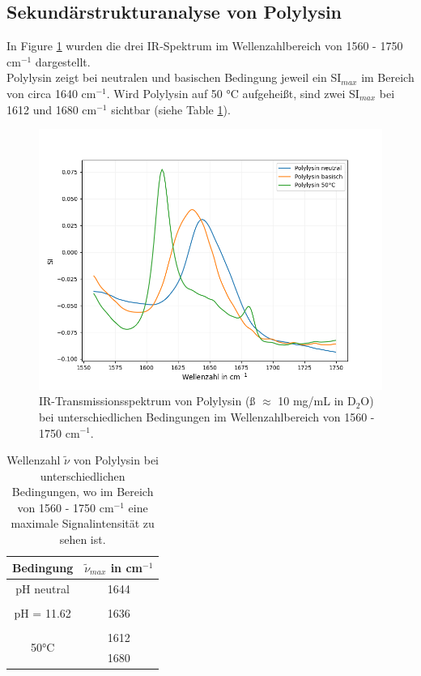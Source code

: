 \documentclass[10pt,a4paper]{article}
\begin{document}
		\subsection{Sekundärstrukturanalyse von Polylysin}
		
			In Figure \ref{fig:polylysin_IR_Spektrum} wurden die drei IR-Spektrum im Wellenzahlbereich von 1560 - 1750 cm$^{-1}$ dargestellt.\\
			Polylysin zeigt bei neutralen und basischen Bedingung jeweil ein SI$_{max}$ im Bereich von circa 1640 cm$^{-1}$. Wird Polylysin auf 50 °C aufgeheißt, sind zwei SI$_{max}$ bei 1612 und 1680 cm$^{-1}$ sichtbar (siehe Table \ref{tab:Polylysin_SI}).
				
			\begin{figure}[H]
				\centering
				\includegraphics[scale=0.65]{Polylysin.png}
				\caption{IR-Transmissionsspektrum von Polylysin (ß $\approx$ 10 mg/mL in D$_2$O) bei unterschiedlichen Bedingungen im Wellenzahlbereich von 1560 - 1750 cm$^{-1}$.}
				\label{fig:polylysin_IR_Spektrum}
			\end{figure}
			
			\begin{table}[H]
				\centering
				\caption{Wellenzahl $\tilde{\nu}$ von Polylysin bei unterschiedlichen Bedingungen, wo im Bereich von 1560 - 1750 cm$^{-1}$ eine maximale Signalintensität zu sehen ist.}
				\label{tab:Polylysin_SI}
				\begin{tabular}{cc}
					\toprule
					Bedingung & $\tilde{\nu}_{max}$ in cm$^{-1}$\\
					\midrule
					pH neutral & 1644\\
					&\\
					pH = 11.62 & 1636\\
					&\\
					\multirow{2}{*}{50°C } & 1612\\
					& 1680\\
					\bottomrule
				\end{tabular}
			\end{table}	
\end{document}
